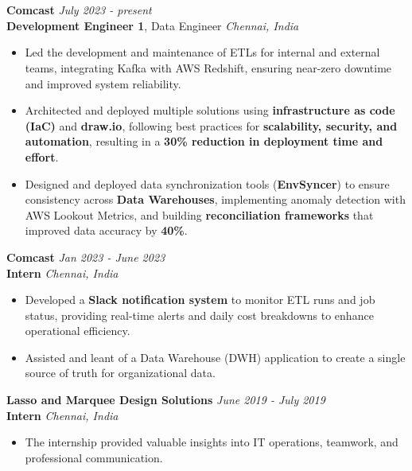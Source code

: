 \documentclass[a4paper,10pt]{article}
\begin{document}
\section{\scshape\color{Fuchsia}{\faUserTie\ \textbf EXPERIENCE}}
\textbf{Comcast} \href{https://corporate.comcast.com/}{} \hfill
\textit{July 2023 - present} \\
\textbf{Development Engineer 1}, Data Engineer \hfill \textit{Chennai, India}
\vspace{-2mm}
\begin{itemize}
    \item Led the development and maintenance of ETLs for internal and external teams, integrating Kafka with AWS Redshift, ensuring near-zero downtime and improved system reliability.
    \vspace{-2mm}
    \item Architected and deployed multiple solutions using \textbf{infrastructure as code (IaC)} and \textbf{draw.io}, following best practices for \textbf{scalability, security, and automation}, resulting in a \textbf{30\% reduction in deployment time and effort}.
    \vspace{-2mm}
    \item Designed and deployed data synchronization tools (\textbf{EnvSyncer}) to ensure consistency across \textbf{Data Warehouses}, implementing anomaly detection with AWS Lookout Metrics, and building \textbf{reconciliation frameworks} that improved data accuracy by \textbf{40\%}.
\end{itemize}
\vspace{-2mm}
\textbf{Comcast} \href{https://drive.google.com/file/d/1pad_OUtVNHKm3s1Kb-_xwyZAXJBjz7gX/view?usp=sharing}{} \hfill \textit{Jan 2023 - June 2023} \\
\textbf{Intern} \hfill \textit{Chennai, India}
\vspace{-2mm}
\begin{itemize}
    \item Developed a \textbf{Slack notification system} to monitor ETL runs and job status, providing real-time alerts and daily cost breakdowns to enhance operational efficiency.
    \vspace{-2mm}
    \item Assisted and leant of a Data Warehouse (DWH) application to create a single source of truth for organizational data.
\end{itemize}
\vspace{-2mm}
\textbf{Lasso and Marquee Design Solutions} \href{https://drive.google.com/file/d/1fMTBkQUhU6_34D5mxVZRf7wBHGMJPdVi/view?usp=sharing}{} \hfill \textit{June 2019 - July 2019} \\
\textbf{Intern} \hfill \textit{Chennai, India}
\vspace{-2mm}
\begin{itemize}
    \item The internship provided valuable insights into IT operations, teamwork, and professional communication.
\end{itemize}
\end{document}
